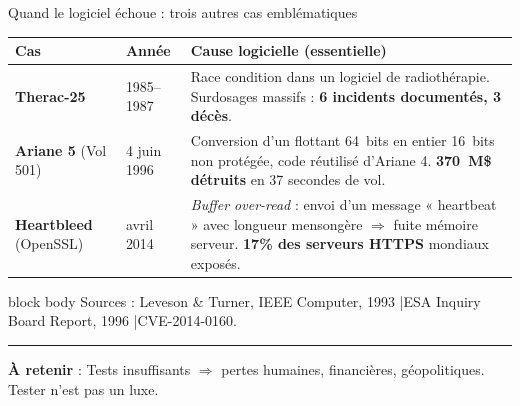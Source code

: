 \documentclass[aspectratio=169,11pt]{beamer}
\newcommand{\takeaway}[1]{%
\vfill\begin{beamercolorbox}[wd=\linewidth,sep=0.4em]{}
\color{accent2}\rule[0.6ex]{1.2em}{1.2pt}\hspace{0.4em}%
\textbf{\color{accent2}\small À retenir} \textcolor{textsoft}{:} %
{\small\color{textmain}#1}
\end{beamercolorbox}}
\begin{document}
\begin{frame}[t]{Quand le logiciel échoue : trois autres cas emblématiques}
\footnotesize
\begin{tabular}{@{}p{2.3cm} p{2.0cm} p{8.2cm}@{}}
\toprule
\textbf{\color{accent}Cas} & \textbf{\color{accent}Année} & \textbf{\color{accent}Cause logicielle (essentielle)} \\
\midrule
\textbf{Therac-25} & 1985--1987 &
Race condition dans un logiciel de radiothérapie. Surdosages massifs : \textbf{6 incidents documentés, 3 décès}. \\
\addlinespace[0.3em]
\textbf{Ariane 5} (Vol 501) & 4 juin 1996 &
Conversion d'un flottant 64~bits en entier 16~bits non protégée, code réutilisé d'Ariane 4. \textbf{370~M\$ détruits} en 37 secondes de vol. \\
\addlinespace[0.3em]
\textbf{Heartbleed} (OpenSSL) & avril 2014 &
\textit{Buffer over-read} : envoi d'un message « heartbeat » avec longueur mensongère $\Rightarrow$ fuite mémoire serveur. \textbf{17\% des serveurs HTTPS} mondiaux exposés. \\
\bottomrule
\end{tabular}
\vspace{0.3cm}
\begin{beamercolorbox}[sep=0.5em,rounded=true]{block body}
\scriptsize Sources : Leveson \& Turner, IEEE Computer, 1993 \quad|\quad ESA Inquiry Board Report, 1996 \quad|\quad CVE-2014-0160.
\end{beamercolorbox}
\takeaway{Tests insuffisants $\Rightarrow$ pertes humaines, financières, géopolitiques. Tester n'est pas un luxe.}
\end{frame}
\end{document}

